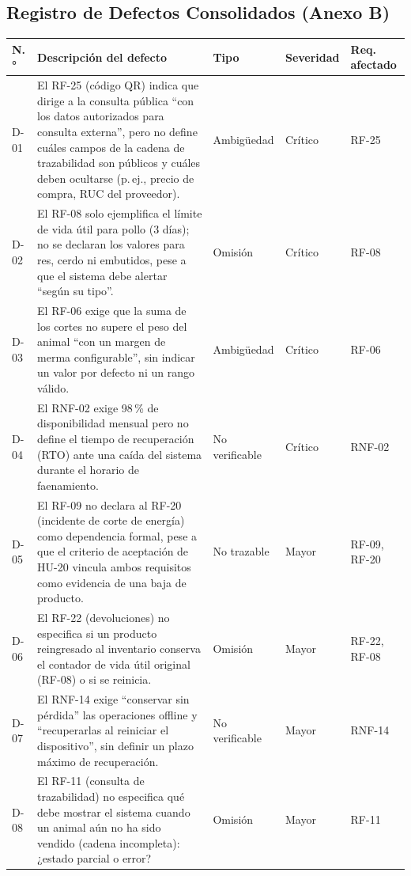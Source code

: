 \documentclass[11pt,a4paper]{article}
\begin{document}
\subsection{Registro de Defectos Consolidados (Anexo B)}
\begin{longtable}{|p{0.8cm}|p{4.9cm}|p{2cm}|p{1.6cm}|p{2.2cm}|}
\hline
\textbf{N.°} & \textbf{Descripción del defecto} & \textbf{Tipo} & \textbf{Severidad} & \textbf{Req. afectado} \\
\hline
\endhead
D-01 & El RF-25 (código QR) indica que dirige a la consulta pública “con los datos autorizados para consulta externa”, pero no define cuáles campos de la cadena de trazabilidad son públicos y cuáles deben ocultarse (p.\,ej., precio de compra, RUC del proveedor). & Ambigüedad & Crítico & RF-25 \\
\hline
D-02 & El RF-08 solo ejemplifica el límite de vida útil para pollo (3 días); no se declaran los valores para res, cerdo ni embutidos, pese a que el sistema debe alertar “según su tipo”. & Omisión & Crítico & RF-08 \\
\hline
D-03 & El RF-06 exige que la suma de los cortes no supere el peso del animal “con un margen de merma configurable”, sin indicar un valor por defecto ni un rango válido. & Ambigüedad & Crítico & RF-06 \\
\hline
D-04 & El RNF-02 exige 98\,\% de disponibilidad mensual pero no define el tiempo de recuperación (RTO) ante una caída del sistema durante el horario de faenamiento. & No verificable & Crítico & RNF-02 \\
\hline
D-05 & El RF-09 no declara al RF-20 (incidente de corte de energía) como dependencia formal, pese a que el criterio de aceptación de HU-20 vincula ambos requisitos como evidencia de una baja de producto. & No trazable & Mayor & RF-09, RF-20 \\
\hline
D-06 & El RF-22 (devoluciones) no especifica si un producto reingresado al inventario conserva el contador de vida útil original (RF-08) o si se reinicia. & Omisión & Mayor & RF-22, RF-08 \\
\hline
D-07 & El RNF-14 exige “conservar sin pérdida” las operaciones offline y “recuperarlas al reiniciar el dispositivo”, sin definir un plazo máximo de recuperación. & No verificable & Mayor & RNF-14 \\
\hline
D-08 & El RF-11 (consulta de trazabilidad) no especifica qué debe mostrar el sistema cuando un animal aún no ha sido vendido (cadena incompleta): ¿estado parcial o error? & Omisión & Mayor & RF-11 \\

\end{longtable}
\end{document}
